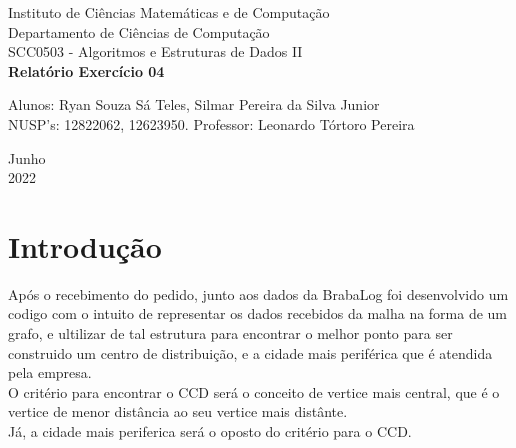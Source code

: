 \documentclass[a4paper, 12pt]{article}
\begin{document}

\begin{titlepage}
	\begin{center}
	

		\Huge{Instituto de Ciências Matemáticas e de Computação}\\
		\large{Departamento de Ciências de Computação}\\ 
		\large{SCC0503 - Algoritmos e Estruturas de Dados II}\\ 
		\vspace{15pt}
        \vspace{95pt}
        \textbf{\LARGE{Relatório Exercício 04}}\\
		\vspace{3,5cm}
	\end{center}
	
	\begin{flushleft}
		\begin{tabbing}
			Alunos: Ryan Souza Sá Teles, Silmar Pereira da Silva Junior \\
            NUSP's: 12822062, 12623950.
			Professor: Leonardo Tórtoro Pereira\\
	\end{tabbing}
 \end{flushleft}
	\vspace{1cm}
	
	\begin{center}
		\vspace{\fill}
			 Junho\\
		 2022
			\end{center}
\end{titlepage}

\newpage
\newpage
\tableofcontents
\thispagestyle{empty}

\newpage
{}
\section{Introdução}
Após o recebimento do pedido, junto aos dados da BrabaLog foi desenvolvido um codigo com o intuito de representar os dados recebidos da malha na forma de um grafo, e ultilizar de tal estrutura para encontrar o melhor ponto para ser construido um centro de distribuição, e a cidade mais periférica que é atendida pela empresa. \\
O critério para encontrar o CCD será o conceito de vertice mais central, que é o vertice de menor distância ao seu vertice mais distânte.\\
Já, a cidade mais periferica será o oposto do critério para o CCD.\\
\end{document}
